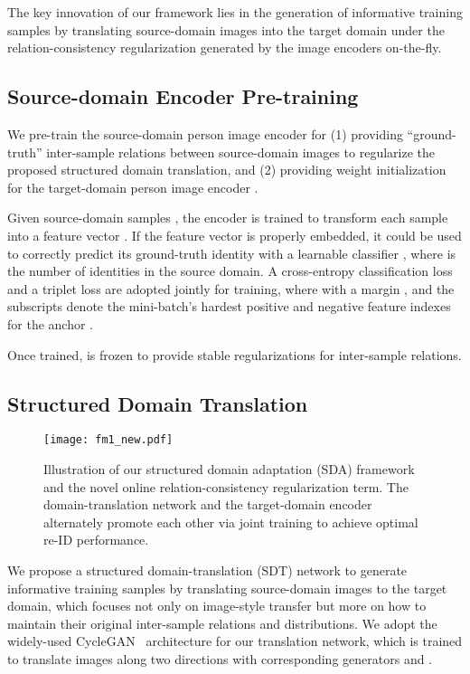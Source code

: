 \documentclass[journal]{IEEEtran}
\begin{document}
The key innovation of our framework lies in the generation of informative training samples by translating source-domain images into the target domain under the relation-consistency regularization generated by the image encoders on-the-fly.


\subsection{Source-domain Encoder Pre-training}
\label{sec:reid}

We pre-train the source-domain person image encoder 
for (1) providing ``ground-truth'' inter-sample relations between source-domain images to regularize the proposed structured domain translation, and
(2) providing weight initialization for the target-domain person image encoder .

Given source-domain samples , the encoder  is trained to transform each sample  into a feature vector .
If the feature vector  is properly embedded, it could be used to correctly predict its ground-truth identity  with a learnable classifier , where  is the number of identities in the source domain.
A cross-entropy classification loss  and a triplet loss \cite{hermans2017defense} are adopted jointly for training,
{
}where
 with a margin , and the subscripts  denote the mini-batch's hardest positive and negative feature indexes for the anchor .

Once trained,  is frozen to provide stable regularizations for inter-sample relations.

\subsection{Structured Domain Translation}
\label{sec:sdt}

\begin{figure}[t]
\centering
\texttt{[image: fm1\_new.pdf]}
\caption{Illustration of our structured domain adaptation (SDA) framework and the novel online relation-consistency regularization term.
The domain-translation network and the target-domain encoder alternately promote each other via joint training to achieve optimal re-ID performance. }
\label{fig:fm}
\end{figure}

We propose a structured domain-translation (SDT) network to generate informative training samples by translating source-domain images  to the target domain, which focuses not only on image-style transfer but more on how to maintain their original inter-sample relations and distributions.
We adopt the widely-used CycleGAN~\cite{zhu2017unpaired} architecture for our translation network, which is trained to translate images along two directions
with corresponding generators  and .
\end{document}
